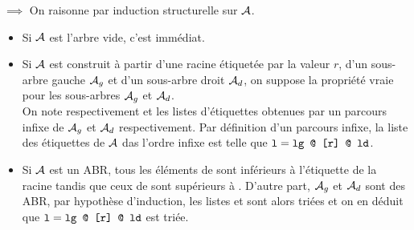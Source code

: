 \begin{demonstration}
    $\implies$ On raisonne par induction structurelle sur $\mathcal{A}$.
    \begin{itemize}
        \item Si $\mathcal{A}$ est l'arbre vide, c'est immédiat.
        \item Si $\mathcal{A}$ est construit à partir d'une racine étiquetée par la valeur $r$, d'un sous-arbre gauche $\mathcal{A}_g$ et d'un sous-arbre droit $\mathcal{A}_d$, on suppose la propriété vraie pour les sous-arbres $\mathcal{A}_g$ et $\mathcal{A}_d$. \\ On note respectivement  et  les listes d'étiquettes obtenues par un parcours infixe de $\mathcal{A}_g$ et $\mathcal{A}_d$ respectivement. Par définition d'un parcours infixe, la liste  des étiquettes de $\mathcal{A}$ das l'ordre infixe est telle que $\texttt{l} = \texttt{lg @ [r] @ ld}$.
        \item Si $\mathcal{A}$ est un ABR, tous les éléments de  sont inférieurs à l’étiquette de la racine tandis que ceux de  sont supérieurs à . D’autre part, $\mathcal{A}_g$ et $\mathcal{A}_d$ sont des ABR, par hypothèse d’induction, les listes  et  sont alors triées et on en déduit que $\texttt{l}=\texttt{lg @ [r] @ ld}$ est triée.
    \end{itemize}
\end{demonstration}

